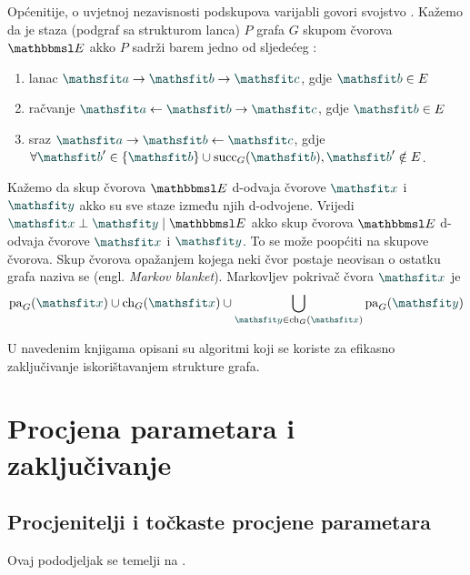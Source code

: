 \documentclass[utf8, diplomski, lmodern]{fer}
\begin{document}
Općenitije, o uvjetnoj nezavisnosti podskupova varijabli govori svojstvo . Kažemo da je staza (podgraf sa strukturom lanca) $P$ grafa $G$  skupom čvorova $\set E$ akko $P$ sadrži barem jedno od sljedećeg \citep{Murphy:2012:MLPP}:
\begin{enumerate}
	\item lanac $\rvar a\rightarrow\rvar b\rightarrow\rvar c$, gdje $\rvar b\in E$
	\item račvanje $\rvar a\leftarrow\rvar b\rightarrow\rvar c$, gdje $\rvar b\in E$
	\item sraz $\rvar a\rightarrow\rvar b\leftarrow\rvar c$, gdje $\forall \rvar b'\in\cbr{\rvar b}\cup\succ_G(\rvar b), \rvar b'\notin E$.
\end{enumerate}
Kažemo da skup čvorova $\set E$ d-odvaja čvorove $\rvar x$ i $\rvar y$ akko su sve staze između njih d-odvojene. Vrijedi $\rvar x\perp\rvar y \mid \set E$ akko skup čvorova $\set E$ d-odvaja čvorove $\rvar x$ i $\rvar y$. To se može poopćiti na skupove čvorova. Skup čvorova opažanjem kojega neki čvor postaje neovisan o ostatku grafa naziva se  (engl. \textit{Markov blanket}). Markovljev pokrivač čvora $\rvar x$ je
\begin{align}
\pa_G(\rvar x)\cup\ch_G(\rvar x)\cup\bigcup_{\rvar y\in\ch_G(\rvar x)}\pa_G(\rvar y)
\end{align}

U navedenim knjigama opisani su algoritmi koji se koriste za efikasno zaključivanje iskorištavanjem strukture grafa.


\section{Procjena parametara i zaključivanje}

\subsection{Procjenitelji i točkaste procjene parametara}

Ovaj pododjeljak se temelji na \citet{Elezovic:2007:VSSV}.
\end{document}
